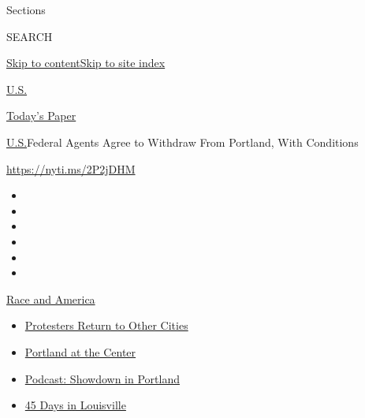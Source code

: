 Sections

SEARCH

\protect\hyperlink{site-content}{Skip to
content}\protect\hyperlink{site-index}{Skip to site index}

\href{https://www.nytimes.com/section/us}{U.S.}

\href{https://myaccount.nytimes.com/auth/login?response_type=cookie\&client_id=vi}{}

\href{https://www.nytimes.com/section/todayspaper}{Today's Paper}

\href{/section/us}{U.S.}\textbar{}Federal Agents Agree to Withdraw From
Portland, With Conditions

\url{https://nyti.ms/2P2jDHM}

\begin{itemize}
\item
\item
\item
\item
\item
\item
\end{itemize}

\href{https://www.nytimes.com/news-event/george-floyd-protests-minneapolis-new-york-los-angeles?action=click\&pgtype=Article\&state=default\&region=TOP_BANNER\&context=storylines_menu}{Race
and America}

\begin{itemize}
\tightlist
\item
  \href{https://www.nytimes.com/2020/07/26/us/protests-portland-seattle-trump.html?action=click\&pgtype=Article\&state=default\&region=TOP_BANNER\&context=storylines_menu}{Protesters
  Return to Other Cities}
\item
  \href{https://www.nytimes.com/2020/07/24/us/portland-oregon-protests-white-race.html?action=click\&pgtype=Article\&state=default\&region=TOP_BANNER\&context=storylines_menu}{Portland
  at the Center}
\item
  \href{https://www.nytimes.com/2020/07/23/podcasts/the-daily/portland-protests.html?action=click\&pgtype=Article\&state=default\&region=TOP_BANNER\&context=storylines_menu}{Podcast:
  Showdown in Portland}
\item
  \href{https://www.nytimes.com/interactive/2020/07/16/us/black-lives-matter-protests-louisville-breonna-taylor.html?action=click\&pgtype=Article\&state=default\&region=TOP_BANNER\&context=storylines_menu}{45
  Days in Louisville}
\end{itemize}

